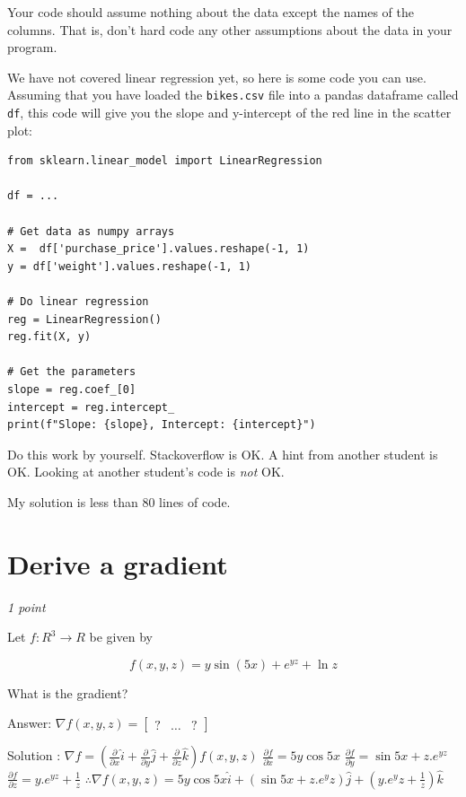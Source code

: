 \documentclass[11pt,english]{article}
\begin{document}
Your code should assume nothing about the data except the names of the columns.   That is, don't hard code any other assumptions about the data in your program.

We have not covered linear regression yet, so here is some code you can use.  Assuming that you have loaded the \texttt{bikes.csv} file into a pandas dataframe called \texttt{df}, this code will give you the slope and y-intercept of the red line in the scatter plot:

\begin{verbatim}
from sklearn.linear_model import LinearRegression

df = ...

# Get data as numpy arrays
X =  df['purchase_price'].values.reshape(-1, 1)
y = df['weight'].values.reshape(-1, 1)

# Do linear regression
reg = LinearRegression()
reg.fit(X, y) 

# Get the parameters
slope = reg.coef_[0]
intercept = reg.intercept_
print(f"Slope: {slope}, Intercept: {intercept}")
\end{verbatim}


Do this work by yourself.   Stackoverflow is OK.   A hint from another student is OK.  Looking at another student's code is \emph{not} OK.

My solution is less than 80 lines of code.

\section{Derive a gradient}

\textit{1 point}

Let $f: R^3 \rightarrow R$ be given by

$$f(x, y,z) = y\sin(5x) + e^{yz} + \ln{z}$$

What is the gradient?

Answer: $\nabla f(x,y,z) =\begin{bmatrix} ? & \ldots & ? \end{bmatrix}$

Solution : $\nabla f =   (\frac{\partial }{\partial x}\hat i  +\frac{\partial }{\partial y}\hat j +\frac{\partial}{\partial z}\hat k)       f(x,y,z)    $ 
\newline
\newline
$\frac{\partial f }{\partial x} = 5y \cos 5x$
\newline
\newline
$\frac{\partial f}{\partial y} =  \sin 5x + z.e^{yz} $
\newline
\newline
$\frac{\partial f}{\partial z} =   y.e^{yz}+ \frac{1}{z} $
\newline
\newline
$\therefore  \nabla f(x,y,z) =  5y \cos 5x \hat i+(\sin 5x +z.e^yz) \hat j +(y.e^yz + \frac{1}{z} )\hat k$
\end{document}
